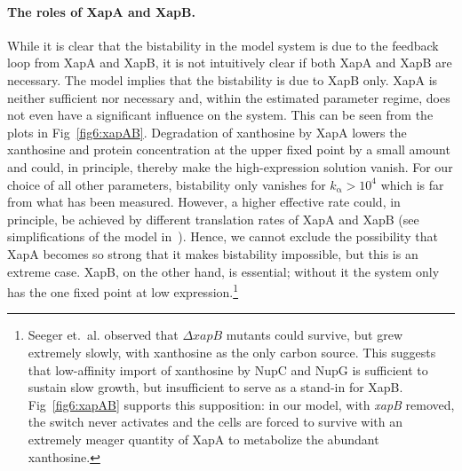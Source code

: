 \documentclass[10pt,letterpaper]{article}
\newcommand{\n}[1]{\mathrm{#1}}
\begin{document}
	\paragraph*{The roles of XapA and XapB.}
	While it is clear that the bistability in the model system is due to the
	feedback loop from XapA and XapB, it is not intuitively clear if both XapA and XapB
	are necessary. The model implies that the bistability is due to XapB only. XapA
	is neither sufficient nor necessary and, within the estimated parameter
	regime, does not even have a significant influence on the system. This can
	be seen from the plots in Fig~\ref{fig6:xapAB}.
	Degradation of xanthosine by XapA lowers the xanthosine and protein concentration at the upper
	fixed point by a small amount and could, in principle, thereby make the
	high-expression solution vanish. For our choice of all other parameters,
	bistability only vanishes for $k_{\n{\alpha}} > 10^4$ which is far from what has been
	measured. However, a higher effective rate could, in principle, be achieved by
	different translation rates of XapA and XapB (see simplifications of the
	model in~). Hence, we cannot exclude the possibility that
	XapA becomes so strong that it makes bistability impossible, but this is an
	extreme case. XapB, on the other hand, is essential; without it the system
	only has the one fixed point at low expression.\footnote{
		Seeger et.\ al.\cite{Seeger1995} observed that $\Delta xapB$ mutants could
		survive, but grew extremely slowly, with xanthosine as the only carbon
		source. This suggests that low-affinity
		import of xanthosine by NupC and NupG is sufficient to sustain slow growth,
		but insufficient to serve as a stand-in for XapB.
		Fig~\ref{fig6:xapAB} supports this supposition: in our model,
		with \textit{xapB} removed, the switch never activates and the cells are
		forced to survive with an extremely meager quantity of XapA to metabolize
		the abundant xanthosine.}
	
\end{document}
